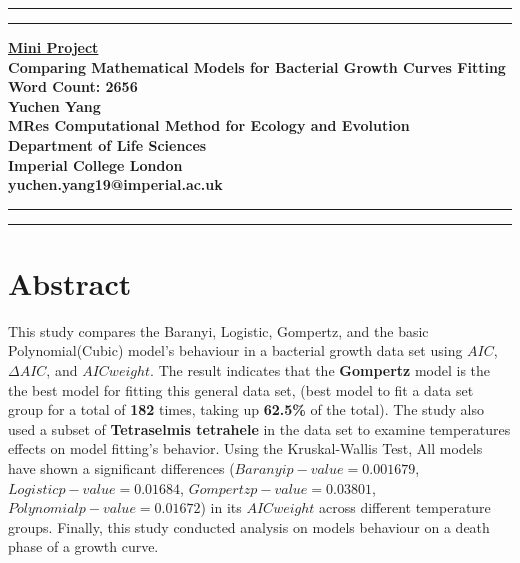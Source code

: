 \documentclass[11pt]{article}
\newcommand{\soptitle}{Comparing Mathematical Models for Bacterial Growth Curves Fitting}
\begin{document}
\begin{titlepage}
\begin{center}
\hrule
\vspace{2pt}
\hrule
\vspace{2cm}
\LARGE {\bf \underline{Mini Project}}\\
\vspace{2cm}
\huge{\bf \soptitle}\\
\large {\bf Word Count: 2656}\\
\vspace{8cm}
\LARGE {\bf Yuchen Yang}\\
\large {\bf MRes Computational Method for Ecology and Evolution}\\
\large {\bf Department of Life Sciences}\\
\large {\bf Imperial College London}\\
\large {\bf yuchen.yang19@imperial.ac.uk}
\vspace{2cm}
\end{center}
\hrule
\vspace{2pt}
\hrule
\end{titlepage}
\linenumbers

\section*{Abstract}
This study compares the Baranyi, Logistic, Gompertz, and the basic Polynomial(Cubic) model's behaviour in a bacterial growth data set using $AIC$, $\Delta AIC$, and $AIC weight$. The result indicates that the \textbf{Gompertz} model is the the best model for fitting this general data set, (best model to fit a data set group for a total of \textbf{182} times, taking up \textbf{62.5\%} of the total). The study also used a subset of \textbf{Tetraselmis tetrahele} in the data set to examine temperatures effects on model fitting's behavior. Using the Kruskal-Wallis Test, All models have shown a significant differences ($Baranyi p-value = 0.001679$, $Logistic p-value = 0.01684$, $Gompertz p-value = 0.03801$, $Polynomial p-value = 0.01672$) in its $AIC weight$ across different temperature groups. Finally, this study conducted analysis on models behaviour on a death phase of a growth curve.
\end{document}
